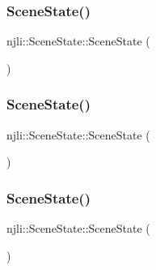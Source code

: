 \subsubsection{\texorpdfstring{Scene\+State()}{SceneState()}\hspace{0.1cm}{\footnotesize\ttfamily [1/3]}}
{\footnotesize\ttfamily njli\+::\+Scene\+State\+::\+Scene\+State (\begin{DoxyParamCaption}{ }\end{DoxyParamCaption})\hspace{0.3cm}{\ttfamily [protected]}}

\mbox{\label{classnjli_1_1_scene_state_af36183061e329d8bee934b0102dcca1a}} 
\subsubsection{\texorpdfstring{Scene\+State()}{SceneState()}\hspace{0.1cm}{\footnotesize\ttfamily [2/3]}}
{\footnotesize\ttfamily njli\+::\+Scene\+State\+::\+Scene\+State (\begin{DoxyParamCaption}\item[{const \mbox{\hyperlink{classnjli_1_1_abstract_builder}{Abstract\+Builder}} \&}]{ }\end{DoxyParamCaption})\hspace{0.3cm}{\ttfamily [protected]}}

\mbox{\label{classnjli_1_1_scene_state_ae224c0ca2d4499a7cfdabecf50f4191a}} 
\subsubsection{\texorpdfstring{Scene\+State()}{SceneState()}\hspace{0.1cm}{\footnotesize\ttfamily [3/3]}}
{\footnotesize\ttfamily njli\+::\+Scene\+State\+::\+Scene\+State (\begin{DoxyParamCaption}\item[{const \mbox{\hyperlink{classnjli_1_1_scene_state}{Scene\+State}} \&}]{ }\end{DoxyParamCaption})\hspace{0.3cm}{\ttfamily [protected]}}


